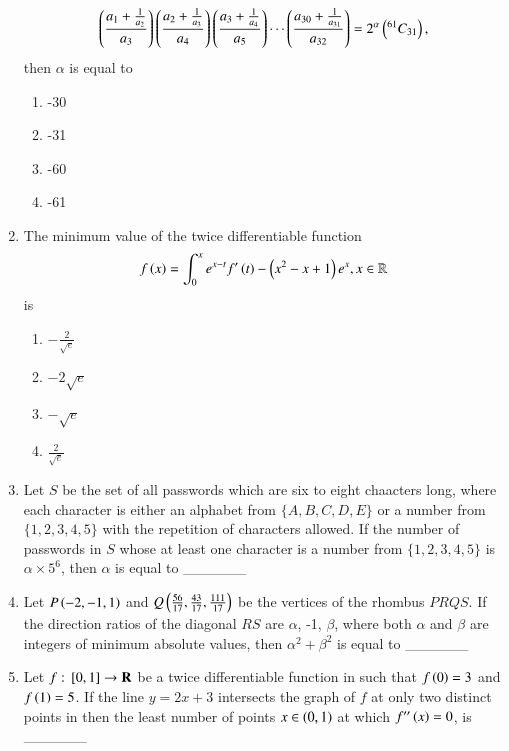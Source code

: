 \documentclass[journal]{IEEEtran}
\begin{document}
\begin{enumerate}
\begin{align*}
    \left(\frac{a_1 + \frac{1}{a_2}}{a_3}\right)\left(\frac{a_2 + \frac{1}{a_3}}{a_4}\right)\left(\frac{a_3 + \frac{1}{a_4}}{a_5}\right)\cdots\left(\frac{a_{30} + \frac{1}{a_{31}}}{a_{32}}\right) = 2^{\alpha}\left(^{61}C_{31}\right),
\end{align*}
then $\alpha$ is equal to 
 \begin{enumerate}
     \item -30
     \item -31
     \item -60
     \item -61\\
 \end{enumerate}
\item The minimum value of the twice differentiable function
\begin{align*}
    f\left(x\right) = \int_{0}^{x}e^{x-t}f'\left(t\right) - \left(x^2 - x + 1\right)e^{x}, x\in\mathbb{R}
\end{align*}
is
\begin{enumerate}
    \item $-\frac{2}{\sqrt{e}}$
    \item $-2\sqrt{e}$
    \item $-\sqrt{e}$
    \item $\frac{2}{\sqrt{e}}$\\
\end{enumerate}
\item Let $S$ be the set of all passwords which are six to eight chaacters long, where each character is either an alphabet from $\{A, B, C, D, E\}$ or a number from $\{1, 2, 3, 4, 5\}$ with the repetition of characters allowed. If the number of passwords in $S$ whose at least one character is a number from $\{1, 2, 3, 4, 5\}$ is $\alpha \times 5^6$, then $\alpha$ is equal to \_\_\_\_\_\_ \\
\item Let $P\left(-2, -1, 1\right)$ and $Q\left(\frac{56}{17}, \frac{43}{17}, \frac{111}{17}\right)$ be the vertices of the rhombus $PRQS$. If the direction ratios of the diagonal $RS$ are $\alpha$, -1, $\beta$, where both $\alpha$ and $\beta$ are integers of minimum absolute values, then $\alpha^2 + \beta^2$ is equal to \_\_\_\_\_\_ \\
\item Let $f:{}\left[0, 1\right]\rightarrow\textbf{R}$ be a twice differentiable function in  such that $f\left(0\right) = 3$ and $f\left(1\right) = 5$. If the line $y = 2x + 3$ intersects the graph of $f$ at only two distinct points in  then the least number of points $x\in\left(0, 1\right)$ at which $f''\left(x\right) = 0$, is \_\_\_\_\_\_ \\

\end{enumerate}
\end{document}
